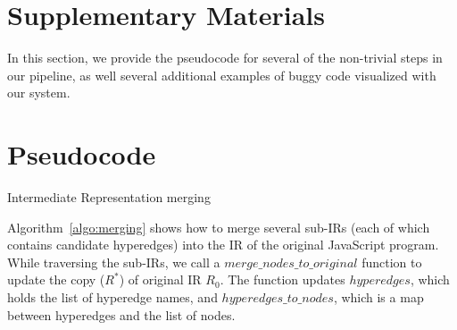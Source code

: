 \documentclass[runningheads]{llncs}
\begin{document}
\begin{appendices}
\section*{Supplementary Materials}
In this section, we  provide the pseudocode for several of the non-trivial steps in our pipeline, as well several additional examples of buggy code visualized with our system.

\section{Pseudocode}
\IncMargin{1em}
\begin{algorithm}  %
 \DontPrintSemicolon
 \BlankLine
 \BlankLine
\caption{Intermediate Representation merging}
\label{algo:merging}
\end{algorithm}
Algorithm~\ref{algo:merging} shows how to merge several sub-IRs (each of which contains candidate hyperedges) into the IR of the original JavaScript program. While traversing the sub-IRs, we call a  $merge\_nodes\_to\_original$ function to update the copy ($R^*$) of original IR $R_0$. The function updates $hyperedges$, which holds the list of hyperedge names, and $hyperedges\_to\_nodes$, which is a map between hyperedges and the list of nodes.

\clearpage


\end{appendices}
\end{document}
